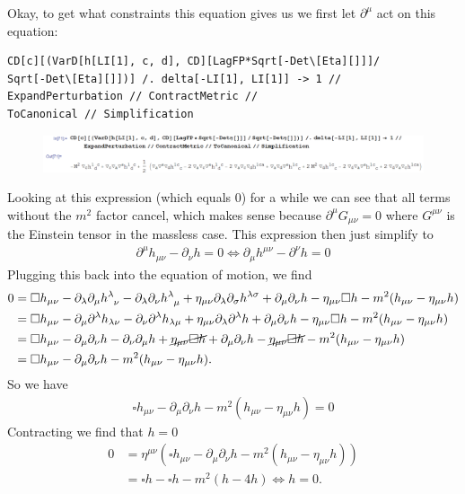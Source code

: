 \documentclass{book}
\theoremstyle{definition}
\newcommand{\p}{\partial}
\newcommand{\nn}{\nonumber}
\newcommand{\lp}{\left(}
\newcommand{\rp}{\right)}
\begin{document}
Okay, to get what constraints this equation gives us we first let $\p^\mu$ act on this equation:
\begin{lstlisting}
CD[c][(VarD[h[LI[1], c, d], CD][LagFP*Sqrt[-Det\[Eta][]]]/
Sqrt[-Det\[Eta][]])] /. delta[-LI[1], LI[1]] -> 1 // 
ExpandPerturbation // ContractMetric // 
ToCanonical // Simplification
\end{lstlisting}
\begin{figure}[!htb]
	\includegraphics[scale=0.26]{covD}
\end{figure}
Looking at this expression (which equals 0) for a while we can see that all terms without the $m^2$ factor cancel, which makes sense because $\p^\mu G_{\mu\nu} = 0$ where $G^{\mu\nu}$ is the Einstein tensor in the massless case. This expression then just simplify to
\begin{align}
\boxed{\p^\mu h_{\mu\nu} - \p_\nu h = 0 \iff \p_\mu h^{\mu\nu} - \p^\nu h = 0}
\end{align}
Plugging this back into the equation of motion, we find
\begin{align}
0 &= \square h_{\mu\nu} - \p_\lambda \p_\mu \tensor{h}{^\lambda_\nu} - \p_\lambda \p_\nu \tensor{h}{^\lambda_\mu} + \eta_{\mu\nu}\p_\lambda \p_\sigma h^{\lambda\sigma} + \p_\mu \p_\nu h - \eta_{\mu\nu}\square h - m^2(h_{\mu\nu} - \eta_{\mu\nu}h)\nn\\
&= \square h_{\mu\nu} - \p_\mu \p^\lambda h_{\lambda\nu} - \p_\nu \p^\lambda h_{\lambda\mu} + \eta_{\mu\nu}\p_\lambda \p^\lambda h + \p_\mu \p_\nu h - \eta_{\mu\nu}\square h - m^2(h_{\mu\nu} - \eta_{\mu\nu}h)\nn\\
&= \square h_{\mu\nu} - \p_\mu \p_\nu h - \p_\nu \p_\mu h + \cancel{\eta_{\mu\nu}\square h} + \p_\mu \p_\nu h - \cancel{\eta_{\mu\nu}\square h} - m^2(h_{\mu\nu} - \eta_{\mu\nu}h)\nn\\
&= \square h_{\mu\nu} - \p_\mu \p_\nu h - m^2(h_{\mu\nu} - \eta_{\mu\nu}h).
\end{align}
So we have
\begin{align}
\boxed{\square h_{\mu\nu} - \p_\mu \p_\nu h - m^2(h_{\mu\nu} - \eta_{\mu\nu}h) = 0}
\end{align}
Contracting we find that $\boxed{h=0}$
\begin{align}
0 &= \eta^{\mu\nu}\lp \square h_{\mu\nu} - \p_\mu \p_\nu h - m^2(h_{\mu\nu} - \eta_{\mu\nu}h) \rp\nn\\
&= \square h - \square h - m^2(h - 4h) \iff h = 0.
\end{align}
\end{document}
